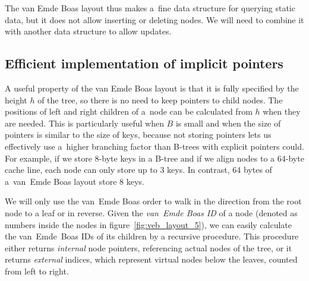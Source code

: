 The van Emde Boas layout thus makes a~fine data structure for querying static
data, but it does not allow inserting or deleting nodes. We will need
to combine it with another data structure to allow updates.

\subsection{Efficient implementation of implicit pointers}
A useful property of the van Emde Boas layout is that it is fully specified
by the height $h$ of the tree, so there is no need to keep pointers to child
nodes. The positions of left and right children of a~node can be calculated
from $h$ when they are needed.
This is particularly useful when $B$ is small and when the size of pointers
is similar to the size of keys, because not storing pointers lets us
effectively use a~higher branching factor than B-trees with explicit
pointers could.
For example, if we store 8-byte keys in a B-tree and if we align nodes to
a 64-byte cache line, each node can only store up to 3 keys. In contrast,
64 bytes of a~van~Emde Boas layout store 8 keys.

We will only use the van~Emde Boas order to walk in the direction from
the root node to a leaf or in reverse.
Given the \emph{van~Emde Boas ID} of a node (denoted as numbers
inside the nodes in figure~\ref{fig:veb_layout_5}),
we can easily calculate the van~Emde~Boas IDs of its children by
a recursive procedure. This procedure either returns \emph{internal} node
pointers, referencing actual nodes of the tree, or it returns \emph{external}
indices, which represent virtual nodes below the leaves, counted from left
to right.

